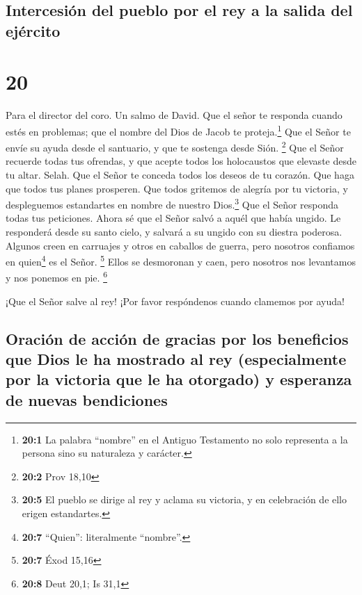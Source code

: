 \hypertarget{intercesiuxf3n-del-pueblo-por-el-rey-a-la-salida-del-ejuxe9rcito}{%
\subsection{Intercesión del pueblo por el rey a la salida del
ejército}\label{intercesiuxf3n-del-pueblo-por-el-rey-a-la-salida-del-ejuxe9rcito}}

\hypertarget{section-19}{%
\section{20}\label{section-19}}

Para el director del coro. Un salmo de David.  Que el
señor te responda cuando estés en problemas; que el nombre del Dios de
Jacob te proteja.\footnote{\textbf{20:1} La palabra ``nombre'' en el
  Antiguo Testamento no solo representa a la persona sino su naturaleza
  y carácter.}  Que el Señor te envíe su ayuda desde el
santuario, y que te sostenga desde Sión. \footnote{\textbf{20:2} Prov
  18,10}  Que el Señor recuerde todas tus ofrendas, y que
acepte todos los holocaustos que elevaste desde tu altar. Selah.
 Que el Señor te conceda todos los deseos de tu corazón.
Que haga que todos tus planes prosperen.  Que todos
gritemos de alegría por tu victoria, y despleguemos estandartes en
nombre de nuestro Dios.\footnote{\textbf{20:5} El pueblo se dirige al
  rey y aclama su victoria, y en celebración de ello erigen estandartes.}
Que el Señor responda todas tus peticiones.  Ahora sé que
el Señor salvó a aquél que había ungido. Le responderá desde su santo
cielo, y salvará a su ungido con su diestra poderosa. 
Algunos creen en carruajes y otros en caballos de guerra, pero nosotros
confiamos en quien\footnote{\textbf{20:7} ``Quien'': literalmente
  ``nombre''.} es el Señor. \footnote{\textbf{20:7} Éxod 15,16}
 Ellos se desmoronan y caen, pero nosotros nos levantamos
y nos ponemos en pie. \footnote{\textbf{20:8} Deut 20,1; Is 31,1}

 ¡Que el Señor salve al rey! ¡Por favor respóndenos cuando
clamemos por ayuda!

\hypertarget{oraciuxf3n-de-acciuxf3n-de-gracias-por-los-beneficios-que-dios-le-ha-mostrado-al-rey-especialmente-por-la-victoria-que-le-ha-otorgado-y-esperanza-de-nuevas-bendiciones}{%
\subsection{Oración de acción de gracias por los beneficios que Dios le
ha mostrado al rey (especialmente por la victoria que le ha otorgado) y
esperanza de nuevas
bendiciones}\label{oraciuxf3n-de-acciuxf3n-de-gracias-por-los-beneficios-que-dios-le-ha-mostrado-al-rey-especialmente-por-la-victoria-que-le-ha-otorgado-y-esperanza-de-nuevas-bendiciones}}

